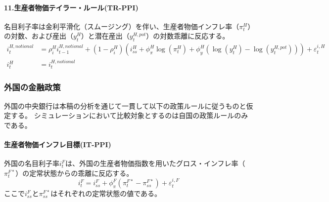 \paragraph{11.生産者物価テイラー・ルール(TR-PPI)}
\label{sec:chapter3_policies_monetary_tr_ppi}
名目利子率は金利平滑化（スムージング）を伴い、生産者物価インフレ率（\(\pi_t^H\)）の対数、および産出（\(y_t^H\)）と潜在産出（\(y_t^{H,pot}\)）の対数乖離に反応する。
\begin{align}
\label{form:chapter3_policies_monetary_home_tr_ppi_i_H_notional_eq}
    i_t^{H,notional}&=\rho_i^Hi_{t-1}^{H,notional}+(1-\rho_i^H)\left(i_{ss}^H+\phi_{\pi}^H\log(\pi_t^H)+\phi_y^H(\log(y_t^H)-\log(y_t^{H,pot}))\right)+\varepsilon_t^{i,H} \\
\label{form:chapter3_policies_monetary_home_tr_ppi_i_H_eq}
    i_t^H&=i_t^{H,notional}
\end{align}

\subsubsection{外国の金融政策}
\label{sec:chapter3_policies_monetary_foreign}
外国の中央銀行は本稿の分析を通じて一貫して以下の政策ルールに従うものと仮定する。
シミュレーションにおいて比較対象とするのは自国の政策ルールのみである。

\paragraph{生産者物価インフレ目標(IT-PPI)}
\label{sec:chapter3_policies_monetary_foreign_it_ppi}
外国の名目利子率\(i_t^F\)は、外国の生産者物価指数を用いたグロス・インフレ率（\(\pi_t^{F*}\)）の定常状態からの乖離に反応する。
\begin{equation}
\label{form:chapter3_policies_monetary_foreign_it_ppi_i_H_eq}
    i_t^F=i_{ss}^F+\phi_{\pi}^F(\pi_t^{F*}-\pi_{ss}^{F*})+\varepsilon_t^{i,F}
\end{equation}
ここで\(i_{ss}^F\)と\(\pi_{ss}^{F*}\)はそれぞれの定常状態の値である。